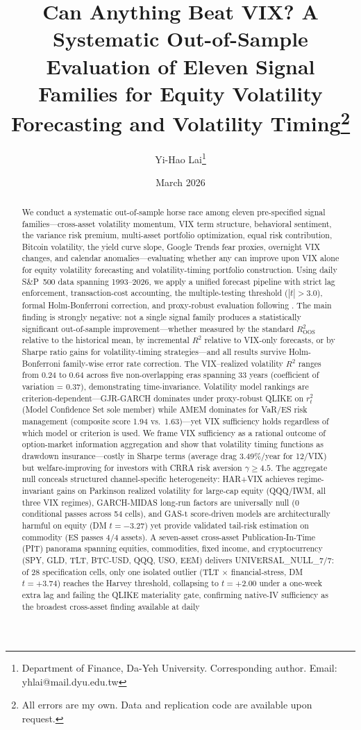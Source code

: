 \documentclass[12pt,a4paper]{article}
\title{Can Anything Beat VIX? A Systematic Out-of-Sample Evaluation of Eleven Signal Families for Equity Volatility Forecasting and Volatility Timing\thanks{All errors are my own. Data and replication code are available upon request.}}
\author{Yi-Hao Lai\thanks{Department of Finance, Da-Yeh University. Corresponding author. Email: yhlai@mail.dyu.edu.tw}}
\date{March 2026}
\begin{document}
\maketitle

\begin{abstract}
\noindent
We conduct a systematic out-of-sample horse race among eleven pre-specified signal families---cross-asset volatility momentum, VIX term structure, behavioral sentiment, the variance risk premium, multi-asset portfolio optimization, equal risk contribution, Bitcoin volatility, the yield curve slope, Google Trends fear proxies, overnight VIX changes, and calendar anomalies---evaluating whether any can improve upon VIX alone for equity volatility forecasting and volatility-timing portfolio construction. Using daily S\&P~500 data spanning 1993--2026, we apply a unified forecast pipeline with strict lag enforcement, transaction-cost accounting, the \citet{harvey2016} multiple-testing threshold ($|t|>3.0$), formal Holm-Bonferroni correction, and proxy-robust evaluation following \citet{patton2011}. The main finding is strongly negative: not a single signal family produces a statistically significant out-of-sample improvement---whether measured by the standard \citet{campbell2008} $R^2_{\text{OOS}}$ relative to the historical mean, by incremental $R^2$ relative to VIX-only forecasts, or by Sharpe ratio gains for volatility-timing strategies---and all results survive Holm-Bonferroni family-wise error rate correction. The VIX--realized volatility $R^2$ ranges from 0.24 to 0.64 across five non-overlapping eras spanning 33 years (coefficient of variation = 0.37), demonstrating time-invariance. Volatility model rankings are criterion-dependent---GJR-GARCH dominates under proxy-robust QLIKE on $r_t^2$ (Model Confidence Set sole member) while AMEM dominates for VaR/ES risk management (composite score 1.94 vs.\ 1.63)---yet VIX sufficiency holds regardless of which model or criterion is used. We frame VIX sufficiency as a rational outcome of option-market information aggregation and show that volatility timing functions as drawdown insurance---costly in Sharpe terms (average drag 3.49\%/year for 12/VIX) but welfare-improving for investors with CRRA risk aversion $\gamma \geq 4.5$. The aggregate null conceals structured channel-specific heterogeneity: HAR+VIX achieves regime-invariant gains on Parkinson realized volatility for large-cap equity (QQQ/IWM, all three VIX regimes), GARCH-MIDAS long-run factors are universally null (0 conditional passes across 54 cells), and GAS-t score-driven models are architecturally harmful on equity (DM $t=-3.27$) yet provide validated tail-risk estimation on commodity (ES passes 4/4 assets). A seven-asset cross-asset Publication-In-Time (PIT) panorama spanning equities, commodities, fixed income, and cryptocurrency (SPY, GLD, TLT, BTC-USD, QQQ, USO, EEM) delivers UNIVERSAL\_NULL\_7/7: of 28 specification cells, only one isolated outlier (TLT $\times$ financial-stress, DM $t=+3.74$) reaches the Harvey threshold, collapsing to $t=+2.00$ under a one-week extra lag and failing the QLIKE materiality gate, confirming native-IV sufficiency as the broadest cross-asset finding available at daily 
\end{abstract}
\end{document}
